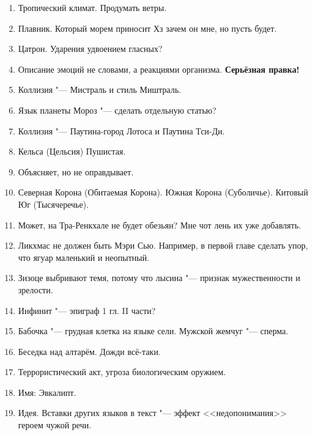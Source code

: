 \documentclass[a4paper,10pt]{book}
\begin{document}
\begin{enumerate}
\item Тропический климат. Продумать ветры.

\item Плавник. Который морем приносит Хз зачем он мне, но пусть будет.

\item Цатрон. Ударения удвоением гласных?

\item Описание эмоций не словами, а реакциями организма. \textbf{Серьёзная правка!}

\item Коллизия "--- Мистраль и стиль Миштраль.

\item Язык планеты Мороз "--- сделать отдельную статью?

\item Коллизия "--- Паутина-город Лотоса и Паутина Тси-Ди.

\item Кельса (Цельсия) Пушистая.

\item Объясняет, но не оправдывает.

\item Северная Корона (Обитаемая Корона). Южная Корона (Суболичье). Китовый Юг (Тысячеречье). 

\item Может, на Тра-Ренкхале не будет обезьян? Мне чот лень их уже добавлять.

\item Ликхмас не должен быть Мэри Сью. Например, в первой главе сделать упор, что ягуар маленький и неопытный.

\item Зизоце выбривают темя, потому что лысина "--- признак мужественности и зрелости.

\item Инфинит "--- эпиграф 1 гл. II части?

\item Бабочка "--- грудная клетка на языке сели. Мужской жемчуг "--- сперма.

\item Беседка над алтарём. Дожди всё-таки.

\item Террористический акт, угроза биологическим оружием.

\item Имя: Эвкалипт.

\item Идея. Вставки других языков в текст "--- эффект <<недопонимания>> героем чужой речи.


\end{enumerate}
\end{document}
